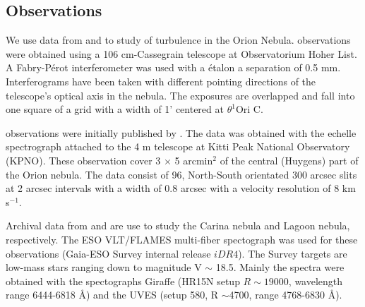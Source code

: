 \documentclass[fleqn,usenatbib, useAMS, a4paper]{mnras}
\begin{document}

\subsection{Observations}

We use data from \citet{1987A&A...176..347H} and \citet{arthur2016turbulence} to study of turbulence in the Orion Nebula.
\cite{1987A&A...176..347H} observations were obtained using a 106 cm-Cassegrain telescope at Observatorium Hoher List. 
A Fabry-Pérot interferometer was used with a étalon a separation of 0.5 mm. 
Interferograms have been taken with different pointing directions of the telescope's optical axis in the nebula. 
The exposures are overlapped and fall into one square of a grid with a width of 1' centered at \(\theta^{1}\)Ori C.

\citet{arthur2016turbulence} observations were initially published by \citet{2008RMxAA..44..181G}. 
The data was obtained with the echelle spectrograph attached to the 4 m telescope at Kitti Peak National Observatory (KPNO).
These observation cover 3 \(\times\) 5 arcmin\(^{2}\) of the central (Huygens) part of the Orion nebula.
The data consist of 96, North-South orientated 300 arcsec slits at 2 arcsec intervals with a width of 0.8 arcsec with a velocity resolution of 8 km s\(^{-1}\).

Archival data from \citet{Damiani:2016a} and \citet{Damiani:2017b} are use to study the Carina nebula and Lagoon nebula, respectively. 
The ESO VLT/FLAMES multi-fiber spectograph \citep{2002Msngr.110....1P} was used for these observations (Gaia-ESO Survey internal release \(iDR4\)). 
The Survey targets are low-mass stars ranging down to magnitude V \(\sim\) 18.5.
Mainly the spectra were obtained with the spectographs Giraffe (HR15N setup \(R \sim19 000\), wavelength range 6444-6818 \AA) and the UVES (setup 580, R \(\sim\)4700, range 4768-6830 \AA).
\end{document}
